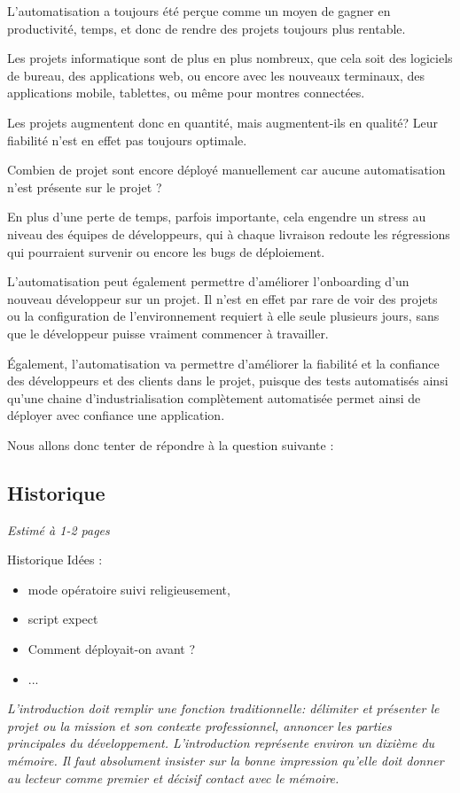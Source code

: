 
L'automatisation a toujours été perçue comme un moyen de gagner en productivité, temps, et donc de rendre des projets toujours plus rentable.
	
Les projets informatique sont de plus en plus nombreux, que cela soit des logiciels de bureau, des applications web, ou encore avec les nouveaux terminaux, des applications mobile, tablettes, ou même pour montres connectées.
	
Les projets augmentent donc en quantité, mais augmentent-ils en qualité? Leur fiabilité n'est en effet pas toujours optimale. 
	
Combien de projet sont encore déployé manuellement car aucune automatisation n'est présente sur le projet ? 
	
En plus d'une perte de temps, parfois importante, cela engendre un stress au niveau des équipes de développeurs, qui à chaque livraison redoute les régressions qui pourraient survenir ou encore les bugs de déploiement.

L'automatisation peut également permettre d'améliorer l'onboarding d'un nouveau développeur sur un projet. Il n'est en effet par rare de voir des projets ou la configuration de l'environnement requiert à elle seule plusieurs jours, sans que le développeur puisse vraiment commencer à travailler.
	
Également, l'automatisation va permettre d'améliorer la fiabilité et la confiance des développeurs et des clients dans le projet, puisque des tests automatisés ainsi qu'une chaine d'industrialisation complètement automatisée permet ainsi de déployer avec confiance une application.
	
Nous allons donc tenter de répondre à la question suivante : 
	
{\LARGE \problematique}
	
\subsection*{Historique}

\textit{Estimé à 1-2 pages}

Historique Idées : 
	
\begin{itemize}
	\item mode opératoire suivi religieusement, 
	\item script expect
	\item Comment déployait-on avant ?
	\item ...
\end{itemize}

\textit{L’introduction doit remplir une fonction traditionnelle: délimiter et présenter le projet ou la mission et son contexte professionnel, annoncer les parties principales du développement. L’introduction représente environ un dixième du mémoire. Il faut absolument insister sur la bonne impression qu’elle doit donner au lecteur comme premier et décisif contact avec le mémoire.}